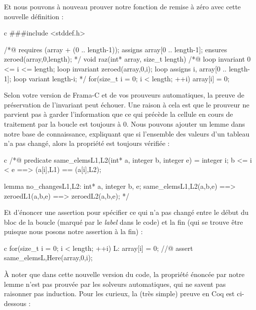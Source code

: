 \documentclass[middle]{zmdocument}
\begin{document}
Et nous pouvons à nouveau prouver notre fonction de remise à zéro avec cette
nouvelle définition :



\begin{CodeBlock}{c}
###include <stddef.h>

/*@
  requires \valid(array + (0 .. length-1));
  assigns  array[0 .. length-1];
  ensures  zeroed(array,0,length);
*/
void raz(int* array, size_t length){
  /*@
    loop invariant 0 <= i <= length;
    loop invariant zeroed(array,0,i);
    loop assigns i, array[0 .. length-1];
    loop variant length-i;
  */
  for(size_t i = 0; i < length; ++i)
    array[i] = 0;
}
\end{CodeBlock}



Selon votre version de Frama-C et de vos prouveurs automatiques, la preuve de 
préservation de l'invariant peut échouer. Une raison à cela est que le prouveur ne
parvient pas à garder l'information que ce qui précède la cellule en cours de
traitement par la boucle est toujours à 0. Nous pouvons ajouter un lemme dans
notre base de connaissance, expliquant que si l'ensemble des valeurs d'un tableau
n'a pas changé, alors la propriété est toujours vérifiée :



\begin{CodeBlock}{c}
/*@
  predicate same_elems{L1,L2}(int* a, integer b, integer e) =
    \forall integer i; b <= i < e ==> \at(a[i],L1) == \at(a[i],L2);

  lemma no_changes{L1,L2}:
  \forall int* a, integer b, e;
  same_elems{L1,L2}(a,b,e) ==> zeroed{L1}(a,b,e) ==> zeroed{L2}(a,b,e);
*/
\end{CodeBlock}



Et d'énoncer une assertion pour spécifier ce qui n'a pas changé entre le début 
du bloc de la boucle (marqué par le \textit{label}  dans le code) et la fin (qui se
trouve être  puisque nous posons notre assertion à la fin) :



\begin{CodeBlock}{c}
for(size_t i = 0; i < length; ++i){
  L:
  array[i] = 0;
  //@ assert same_elems{L,Here}(array,0,i);
}
\end{CodeBlock}



À noter que dans cette nouvelle version du code, la propriété énoncée par notre
lemme n'est pas prouvée par les solveurs automatiques, qui ne savent pas raisonner
pas induction. Pour les curieux, la (très simple) preuve en Coq est ci-dessous :
\end{document}
